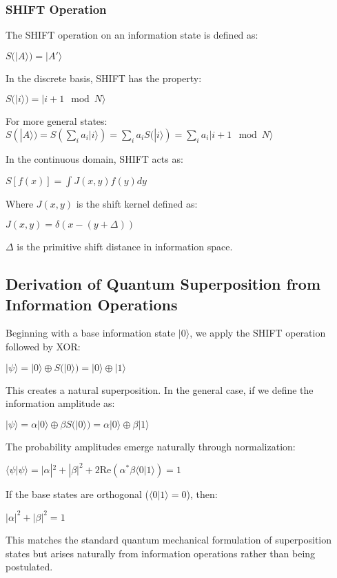 \documentclass[12pt,letterpaper]{article}
\begin{document}
\subsubsection{SHIFT Operation}

The SHIFT operation on an information state is defined as:

$S(|A\rangle) = |A'\rangle$

In the discrete basis, SHIFT has the property:

$S(|i\rangle) = |i+1 \mod N\rangle$

For more general states:
$S(|A\rangle) = S\left(\sum_i a_i |i\rangle\right) = \sum_i a_i S(|i\rangle) = \sum_i a_i |i+1 \mod N\rangle$

In the continuous domain, SHIFT acts as:

$S[f(x)] = \int J(x,y)f(y)dy$

Where $J(x,y)$ is the shift kernel defined as:

$J(x,y) = \delta(x - (y + \Delta))$

$\Delta$ is the primitive shift distance in information space.

\subsection{Derivation of Quantum Superposition from Information Operations}

Beginning with a base information state $|0\rangle$, we apply the SHIFT operation followed by XOR:

$|\psi\rangle = |0\rangle \oplus S(|0\rangle) = |0\rangle \oplus |1\rangle$

This creates a natural superposition. In the general case, if we define the information amplitude as:

$|\psi\rangle = \alpha|0\rangle \oplus \beta S(|0\rangle) = \alpha|0\rangle \oplus \beta|1\rangle$

The probability amplitudes emerge naturally through normalization:

$\langle \psi|\psi \rangle = |\alpha|^2 + |\beta|^2 + 2\text{Re}(\alpha^*\beta\langle 0|1 \rangle) = 1$

If the base states are orthogonal ($\langle 0|1 \rangle = 0$), then:

$|\alpha|^2 + |\beta|^2 = 1$

This matches the standard quantum mechanical formulation of superposition states but arises naturally from information operations rather than being postulated.
\end{document}
